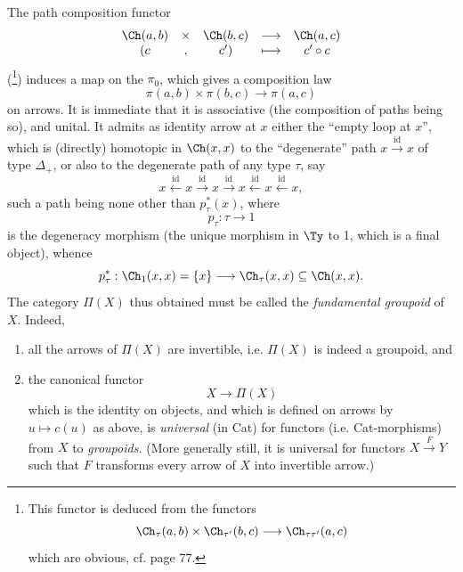 The path composition functor
\[
\begin{array}{ccccc}
\Ch(a,b) & \times & \Ch(b,c) & \longrightarrow & \Ch(a,c)\\
(c & , & c') & \longmapsto & c' \circ c
\end{array}
\]
 (\footnote[17]{This functor is deduced from the functors
\[
\Ch_\tau(a,b) \times \Ch_{\tau'}(b,c) \longrightarrow \Ch_{\tau\tau'}(a,c)
\]
which are obvious, cf. page 77.}) induces a map on the $\pi_0$, which gives a composition law
\[
\pi(a,b) \times \pi(b,c) \longrightarrow \pi(a,c)
\]
on arrows. It is immediate that it is associative (the composition of paths being so), and unital. It admits as identity arrow at $x$ either the ``empty loop at $x$'', which is (directly) homotopic in $\Ch(x,x)$ to the ``degenerate'' path $x \xrightarrow{\mathrm{id}} x$
of type $\Delta_+$, or also to the degenerate path of any type $\tau$, say
\[
x \xleftarrow{\mathrm{id}} x \xrightarrow{\mathrm{id}} x \xrightarrow{\mathrm{id}} x \xleftarrow{\mathrm{id}} x \xleftarrow{\mathrm{id}} x,
\]
such a path being none other than $p_\tau^*(x)$, where
\[
p_\tau : \tau \longrightarrow 1
\]
is the degeneracy morphism (the unique morphism in $\Ty$ to 1, which is a final object), whence
\[
p_\tau^* : \Ch_1(x,x) = \{x\} \longrightarrow \Ch_\tau(x,x) \subseteq \Ch(x,x).
\]
The category $\Pi(X)$ thus obtained must be called the \textit{fundamental groupoid} of $X$. Indeed, %

\begin{enumerate}[label=\alph*)]
\item all the arrows of $\Pi(X)$ are invertible, i.e. $\Pi(X)$ is indeed a groupoid, and
\item the canonical functor
\[
X \longrightarrow \Pi(X)
\]
which is the identity on objects, and which is defined on arrows by $u \longmapsto c(u)$ as above, is \textit{universal} (in Cat) for functors (i.e. Cat-morphisms) from $X$ to \textit{groupoids.} (More generally still, it is universal for functors $X \xrightarrow{F} Y$ such that $F$ transforms every arrow of $X$ into invertible arrow.)
\end{enumerate}

